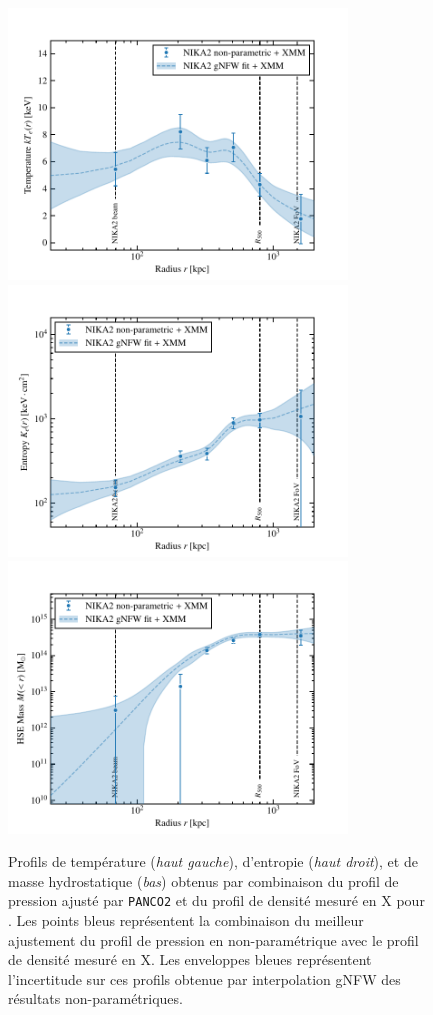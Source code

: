 \begin{figure}[t]
    \centering
    \includegraphics[height=7.2cm, trim={0cm 0cm 1cm 0cm}, clip]{Figures/Chap_panco/demo_plots/temperature.pdf}
    \includegraphics[height=7.2cm, trim={0cm 0cm 1cm 0cm}, clip]{Figures/Chap_panco/demo_plots/entropy.pdf} \\
    \includegraphics[height=7.2cm]{Figures/Chap_panco/demo_plots/mass.pdf}
    \caption{
        Profils de température (\textit{haut gauche}), d'entropie (\textit{haut droit}), et de masse hydrostatique (\textit{bas}) obtenus par combinaison du profil de pression ajusté par \texttt{PANCO2} et du profil de densité mesuré en X pour \act.
        Les points bleus représentent la combinaison du meilleur ajustement du profil de pression en non-paramétrique avec le profil de densité mesuré en X.
        Les enveloppes bleues représentent l'incertitude sur ces profils obtenue par interpolation gNFW des résultats non-paramétriques.
    }
    \label{fig:panco2:actlike_thermo}
\end{figure}


